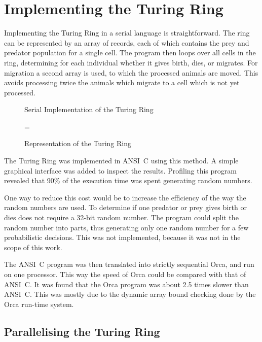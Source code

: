 \section{Implementing the Turing Ring}
\label{sImpTur}

Implementing the Turing Ring in a serial language is
straightforward. The ring can be represented by an array of records,
each of which contains the prey and predator population for a single cell.
The program then loops over all cells in the ring, determining for
each individual whether it gives birth, dies, or
migrates. For migration a second array is used, to which the processed
animals are moved. This avoids processing twice the animals which
migrate to a cell which is not yet processed.

\begin{figure}
\begin{tgrind}

\end{tgrind}
\caption{Serial Implementation of the Turing Ring}
\label{fSerialTuring}
\end{figure}

\begin{figure}
\epsfxsize=\textwidth
{}
\caption{Representation of the Turing Ring}
\label{fRepresentation}
\end{figure}

The Turing Ring was implemented in ANSI~C using this method.
A simple graphical interface was added to inspect the results.
Profiling this program revealed that 90\% of the
execution time was spent generating random numbers. 

One way to reduce this cost would be to increase the efficiency of the
way the random numbers are used. To determine if one predator or prey
gives birth or dies does not require a 32-bit random number. The
program could split the random number into parts, thus generating only
one random number for a few probabilistic decisions. This was not
implemented, because it was not in the scope of this work.

The ANSI~C program was then translated into strictly sequential Orca, and 
run on one
processor. This way the speed of Orca could be compared with that of
ANSI~C. It was found that the Orca program was about 2.5 times slower
than ANSI~C. This was mostly due to the dynamic array bound checking done
by the Orca run-time system.

\subsection {Parallelising the Turing Ring}

